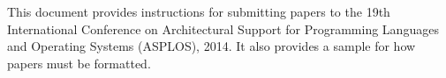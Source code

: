 
This document provides instructions for submitting papers to the 19th
International Conference on Architectural Support for Programming Languages
and Operating Systems (ASPLOS), 2014.  It also provides a sample for how
papers must be formatted.

